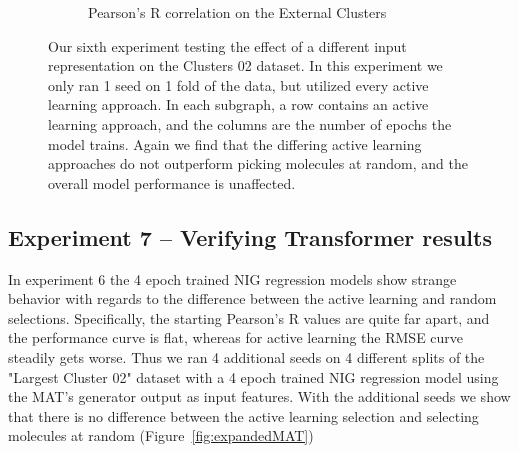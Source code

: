 \documentclass[journal=jmcmar,manuscript=article]{achemso}
\begin{document}
\begin{figure}[tbph]
\begin{subfigure}[b]{0.48\textwidth}
        \caption{Pearson's R correlation on the External Clusters}
    \end{subfigure}
    \caption{Our sixth experiment testing the effect of a different input representation on the Clusters 02 dataset. In this experiment we only ran 1 seed on 1 fold of the data, but utilized every active learning approach. In each subgraph, a row contains an active learning approach, and the columns are the number of epochs the model trains. Again we find that the differing active learning approaches do not outperform picking molecules at random, and the overall model performance is unaffected.}
    \label{fig:MATinput}
\end{figure}

\subsection{Experiment 7 -- Verifying Transformer results}

In experiment 6 the 4 epoch trained NIG regression models show strange behavior with regards to the difference between the active learning and random selections. Specifically, the starting Pearson's R values are quite far apart, and the performance curve is flat, whereas for active learning the RMSE curve steadily gets worse. Thus we ran 4 additional seeds on 4 different splits of the "Largest Cluster 02" dataset with a 4 epoch trained NIG regression model using the MAT's generator output as input features. With the additional seeds we show that there is no difference between the active learning selection and selecting molecules at random (Figure~\ref{fig:expandedMAT})
\end{document}
